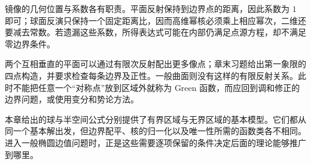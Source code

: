 镜像的几何位置与系数各有职责。平面反射保持到边界点的距离，因此系数为 \(1\) 即可；球面反演只保持一个固定距离比，因而高维幂核必须乘上相应幂次，二维还要减去常数。若遗漏这些系数，所得表达式可能在内部仍满足点源方程，却不满足零边界条件。

\ProseParagraphBreak

两个互相垂直的平面可以通过有限次反射配出更多像点；章末习题给出第一象限的四点构造，并要求检查每条边界及正性。一般曲面则没有这样的有限反射关系。此时不能把任意一个“对称点”放到区域外就称为 Green 函数，而应回到调和修正的边界问题，或使用变分和势论方法。

\ProseParagraphBreak

本章给出的球与半空间公式分别提供了有界区域与无界区域的基本模型。它们都从同一个基本解出发，但边界配平、核的归一化以及唯一性所需的函数类各不相同。进入一般椭圆边值问题时，正是这些需要逐项保留的条件决定后面的理论能够推广到哪里。
